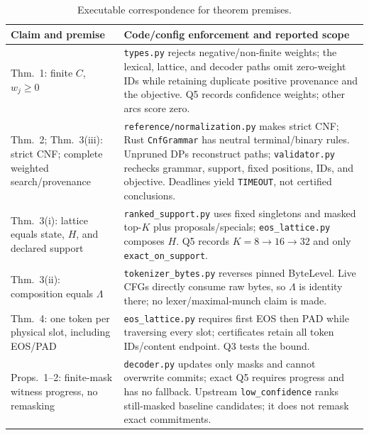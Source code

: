\begin{table}[ht]
\centering
\caption{Executable correspondence for theorem premises.}
\label{tab:theorem-code}
\scriptsize
\begin{tabular}{p{3.65cm}p{7.55cm}}
\toprule
Claim and premise & Code/config enforcement and reported scope \\ \midrule
Thm.~1: finite $C$, $w_j\geq0$ & \texttt{types.py} rejects negative/non-finite weights; the lexical, lattice, and decoder paths omit zero-weight IDs while retaining duplicate positive provenance and the objective. Q5 records confidence weights; other arcs score zero. \\
Thm.~2; Thm.~3(iii): strict CNF; complete weighted search/provenance & \texttt{reference/normalization.py} makes strict CNF; Rust \texttt{CnfGrammar} has neutral terminal/binary rules. Unpruned DPs reconstruct paths; \texttt{validator.py} rechecks grammar, support, fixed positions, IDs, and objective. Deadlines yield \texttt{TIMEOUT}, not certified conclusions. \\
Thm.~3(i): lattice equals state, $H$, and declared support & \texttt{ranked\_support.py} uses fixed singletons and masked top-$K$ plus proposals/specials; \texttt{eos\_lattice.py} composes $H$. Q5 records $K=8\rightarrow16\rightarrow32$ and only \texttt{exact\_on\_support}. \\
Thm.~3(ii): composition equals $\Lambda$ & \texttt{tokenizer\_bytes.py} reverses pinned ByteLevel. Live CFGs directly consume raw bytes, so $\Lambda$ is identity there; no lexer/maximal-munch claim is made. \\
Thm.~4: one token per physical slot, including EOS/PAD & \texttt{eos\_lattice.py} requires first EOS then PAD while traversing every slot; certificates retain all token IDs/content endpoint. Q3 tests the bound. \\
Props.~1--2: finite-mask witness progress, no remasking & \texttt{decoder.py} updates only masks and cannot overwrite commits; exact Q5 requires progress and has no fallback. Upstream \texttt{low\_confidence} ranks still-masked baseline candidates; it does not remask exact commitments. \\
\bottomrule
\end{tabular}
\end{table}

